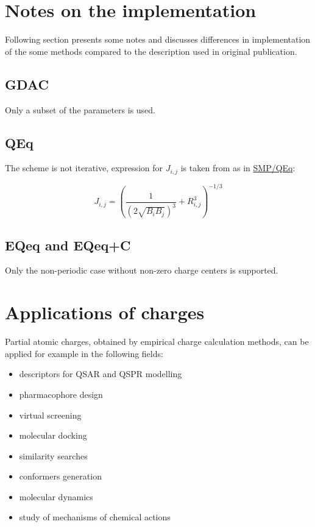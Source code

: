 \documentclass[oneside]{memoir}
\newcommand\ddfrac[2]{\frac{\displaystyle #1}{\displaystyle #2}}
\begin{document}
\chapter*{Notes on the implementation}

Following section presents some notes and discusses differences in implementation of the some methods compared to the description used in original publication.

\section*{GDAC}
Only a subset of the parameters is used.

\section*{QEq}
The scheme is not iterative, expression for $J_{i,j}$ is taken from \cite{Louwen1998} as in \hyperref[sec:methods_smpqeq]{SMP/QEq}:

\begin{equation}
\label{eq:qeq_louwen}
J_{i, j} = \left(\ddfrac{1}{(2\sqrt{B_iB_j})^3} + R_{i,j}^3\right)^{-1/3}
\end{equation}

\section*{EQeq and EQeq+C}
Only the non-periodic case without non-zero charge centers is supported.

\chapter*{Applications of charges}

Partial atomic charges, obtained by empirical charge calculation methods, can be applied for example in the following fields:

\begin{itemize}
\item descriptors for QSAR and QSPR modelling \cite{Svobodova2011, Varekova2013, Geidl2015, Dixon1993, Zhang2006, Gross2002, Ghafourian2000, Dudek2006, Karelson1996}
\item pharmacophore design \cite{Todeschini2008, Galvez1994, Stalke2011}
\item virtual screening \cite{Mannhold2006, Macdougall2007, Clement2000}
\item molecular docking \cite{Park2006, Nebgen2018, Rimac2017}
\item similarity searches \cite{Kearsley1996, Nikolova2003, Holliday2003}
\item conformers generation \cite{Vainio2007}
\item molecular dynamics \cite{Rappe1991, Chenoweth2008, Nejad2018, Lee2018}
\item study of mechanisms of chemical actions \cite{Ionescu2012, Rimac2017, Wheeler2019}
\end{itemize}

\printbibliography
\end{document}
